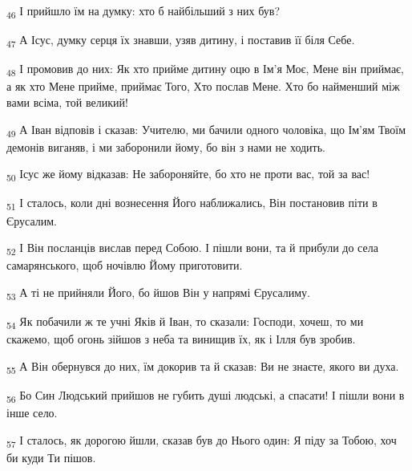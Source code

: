 \begin{tcolorbox}
\textsubscript{46} І прийшло їм на думку: хто б найбільший з них був?
\end{tcolorbox}
\begin{tcolorbox}
\textsubscript{47} А Ісус, думку серця їх знавши, узяв дитину, і поставив її біля Себе.
\end{tcolorbox}
\begin{tcolorbox}
\textsubscript{48} І промовив до них: Як хто прийме дитину оцю в Ім'я Моє, Мене він приймає, а як хто Мене прийме, приймає Того, Хто послав Мене. Хто бо найменший між вами всіма, той великий!
\end{tcolorbox}
\begin{tcolorbox}
\textsubscript{49} А Іван відповів і сказав: Учителю, ми бачили одного чоловіка, що Ім'ям Твоїм демонів виганяв, і ми заборонили йому, бо він з нами не ходить.
\end{tcolorbox}
\begin{tcolorbox}
\textsubscript{50} Ісус же йому відказав: Не забороняйте, бо хто не проти вас, той за вас!
\end{tcolorbox}
\begin{tcolorbox}
\textsubscript{51} І сталось, коли дні вознесення Його наближались, Він постановив піти в Єрусалим.
\end{tcolorbox}
\begin{tcolorbox}
\textsubscript{52} І Він посланців вислав перед Собою. І пішли вони, та й прибули до села самарянського, щоб ночівлю Йому приготовити.
\end{tcolorbox}
\begin{tcolorbox}
\textsubscript{53} А ті не прийняли Його, бо йшов Він у напрямі Єрусалиму.
\end{tcolorbox}
\begin{tcolorbox}
\textsubscript{54} Як побачили ж те учні Яків й Іван, то сказали: Господи, хочеш, то ми скажемо, щоб огонь зійшов з неба та винищив їх, як і Ілля був зробив.
\end{tcolorbox}
\begin{tcolorbox}
\textsubscript{55} А Він обернувся до них, їм докорив та й сказав: Ви не знаєте, якого ви духа.
\end{tcolorbox}
\begin{tcolorbox}
\textsubscript{56} Бо Син Людський прийшов не губить душі людські, а спасати! І пішли вони в інше село.
\end{tcolorbox}
\begin{tcolorbox}
\textsubscript{57} І сталось, як дорогою йшли, сказав був до Нього один: Я піду за Тобою, хоч би куди Ти пішов.
\end{tcolorbox}
